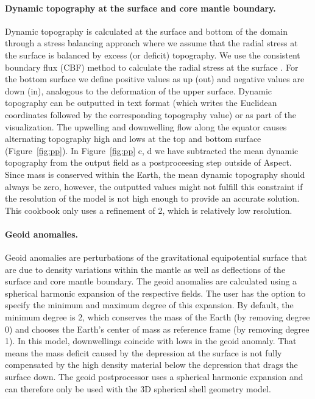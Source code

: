 \documentclass{article}
\begin{document}
\paragraph{Dynamic topography at the surface and core mantle boundary.}
Dynamic topography is calculated at the surface and bottom of the domain 
through a stress balancing approach where we assume that the radial stress at 
the surface is balanced by excess (or deficit) topography. We use the 
consistent boundary flux (CBF) method to calculate the radial stress 
at the surface \cite{ZGH93}. For the 
bottom surface we define positive values as up (out)
and negative values are down (in), analogous to the deformation of the upper 
surface. Dynamic topography can be outputted in text format (which writes the 
Euclidean coordinates followed by the corresponding topography value) or as 
part of the visualization. The upwelling and downwelling flow along the 
equator causes alternating topography high and lows at the top and
bottom surface (Figure~\ref{fig:pp}). 
In Figure~\ref{fig:pp} c, d we have subtracted the mean dynamic topography from
the output field as a postproceesing step outside of Aspect. Since mass is 
conserved within the Earth, the mean dynamic topography
should always be zero, however, the outputted values might not fulfill this 
constraint if the resolution of the model is not high enough to provide an
accurate solution. This cookbook only uses a refinement of 2, which is relatively
low resolution. 

\paragraph{Geoid anomalies.}
Geoid anomalies are perturbations of the gravitational equipotential surface that 
are due to density variations within the mantle as well as deflections of the 
surface and core mantle boundary. The geoid anomalies are calculated using a spherical
harmonic expansion of the respective fields. The user has the option to specify the 
minimum and maximum degree of this expansion. By default, the minimum degree is
2, which conserves the mass of the Earth (by removing degree 0) and chooses the
Earth's center of mass as reference frame (by removing degree 1). 
In this model, downwellings coincide with lows in the geoid anomaly. That 
means the mass deficit caused by the depression at the surface is not 
fully compensated by the high density material below the depression that 
drags the surface down. The geoid postprocessor uses a spherical harmonic 
expansion and can therefore only be used with the 3D spherical shell geometry model.
 
\end{document}
